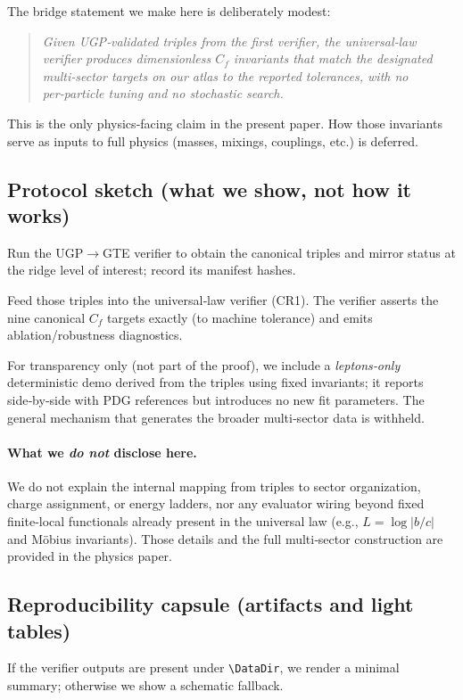 \documentclass[12pt]{article}
\numberwithin{equation}{section}
\providecommand{\DataDir}{.} %
\begin{document}
The bridge statement we make here is deliberately modest:

\begin{quote}
\emph{Given UGP‑validated triples from the first verifier, the universal‑law verifier produces dimensionless $C_f$ invariants that match the designated multi‑sector targets on our atlas to the reported tolerances, with no per‑particle tuning and no stochastic search.}
\end{quote}

This is the only physics‑facing claim in the present paper. How those invariants serve as inputs to full physics (masses, mixings, couplings, etc.) is deferred.

\subsection{Protocol sketch (what we show, not how it works)}\label{subsec:physics-protocol}
\begin{description}[leftmargin=1.2em]
  \item[\textsf{Step A:}] Run the UGP$\to$GTE verifier to obtain the canonical triples and mirror status at the ridge level of interest; record its manifest hashes.
  \item[\textsf{Step B:}] Feed those triples into the universal‑law verifier (CR1). The verifier asserts the nine canonical $C_f$ targets exactly (to machine tolerance) and emits ablation/robustness diagnostics.
  \item[\textsf{Step C (optional demo):}] For transparency only (not part of the proof), we include a \emph{leptons‑only} deterministic demo derived from the triples using fixed invariants; it reports side‑by‑side with PDG references but introduces no new fit parameters. The general mechanism that generates the broader multi‑sector data is withheld.
\end{description}

\paragraph{What we \emph{do not} disclose here.}
We do not explain the internal mapping from triples to sector organization, charge assignment, or energy ladders, nor any evaluator wiring beyond fixed finite‑local functionals already present in the universal law (e.g., $L=\log|b/c|$ and Möbius invariants). Those details and the full multi‑sector construction are provided in the physics paper.

\subsection{Reproducibility capsule (artifacts and light tables)}\label{subsec:physics-reproducibility}
If the verifier outputs are present under \verb|\DataDir|, we render a minimal summary; otherwise we show a schematic fallback.
\end{document}
